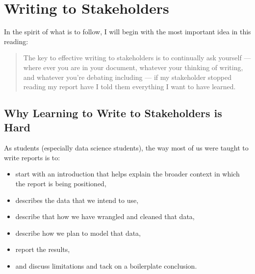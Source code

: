\documentclass[letterpaper,10pt,english]{jupyterBook}
\begin{document}
\sphinxstepscope


\chapter{Writing to Stakeholders}
\label{\detokenize{40_in_practice/25_writing_to_stakeholders:writing-to-stakeholders}}\label{\detokenize{40_in_practice/25_writing_to_stakeholders::doc}}
\sphinxAtStartPar
In the spirit of what is to follow, I will begin with the most important idea in this reading:
\begin{quote}

\sphinxAtStartPar
The key to effective writing to stakeholders is to continually ask yourself — where ever you are in your document, whatever your thinking of writing, and whatever you’re debating including — if my stakeholder stopped reading my report  have I told them everything I want  to have learned.
\end{quote}


\section{Why Learning to Write to Stakeholders is Hard}
\label{\detokenize{40_in_practice/25_writing_to_stakeholders:why-learning-to-write-to-stakeholders-is-hard}}
\sphinxAtStartPar
As students (especially data science students), the way most of us were taught to write reports is to:
\begin{itemize}
\item {} 
\sphinxAtStartPar
start with an introduction that helps explain the broader context in which the report is being positioned,

\item {} 
\sphinxAtStartPar
describes the data that we intend to use,

\item {} 
\sphinxAtStartPar
describe that how we have wrangled and cleaned that data,

\item {} 
\sphinxAtStartPar
describe how we plan to model that data,

\item {} 
\sphinxAtStartPar
report the results,

\item {} 
\sphinxAtStartPar
and discuss limitations and tack on a boilerplate conclusion.

\end{itemize}
\end{document}

